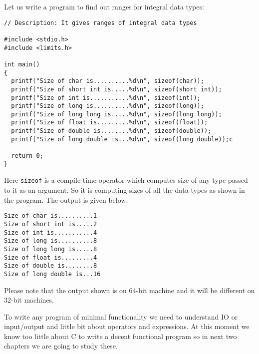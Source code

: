 Let us write a program to find out ranges for integral data types:

\begin{verbatim}
// Description: It gives ranges of integral data types

#include <stdio.h>
#include <limits.h>

int main()
{
  printf("Size of char is..........%d\n", sizeof(char));
  printf("Size of short int is.....%d\n", sizeof(short int));
  printf("Size of int is...........%d\n", sizeof(int));
  printf("Size of long is..........%d\n", sizeof(long));
  printf("Size of long long is.....%d\n", sizeof(long long));
  printf("Size of float is.........%d\n", sizeof(float));
  printf("Size of double is........%d\n", sizeof(double));
  printf("Size of long double is...%d\n", sizeof(long double));c

  return 0;
}
\end{verbatim}

Here \texttt{sizeof} is a compile time operator which computes size of any type
passed to it as an argument. So it is computing sizes of all the data types as
shown in the program. The output is given below:

\begin{verbatim}
Size of char is..........1
Size of short int is.....2
Size of int is...........4
Size of long is..........8
Size of long long is.....8
Size of float is.........4
Size of double is........8
Size of long double is...16
\end{verbatim}

Please note that the output shown is on 64-bit machine and it will be different
on 32-bit machines.

To write any program of minimal functionality we need to understand IO or
input/output and little bit about operators and expressions. At this moment we
know too little about C to write a decent functional program so in next two
chapters we are going to study these.
